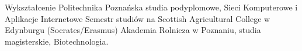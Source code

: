 \begin{rubric}{Wykształcenie}
Politechnika Poznańska studia podyplomowe, Sieci
Komputerowe i Aplikacje Internetowe
Semestr studiów na Scottish Agricultural
College w Edynburgu (Socrates/Erasmus)
\entry*[2001 -- 2006]Akademia Rolnicza w Poznaniu, studia magisterskie,
	Biotechnologia.
\end{rubric}
